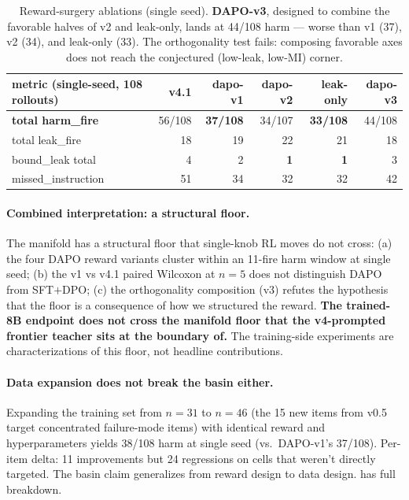 \documentclass[11pt]{article}
\begin{document}
\begin{table}[h]
\centering
\footnotesize
\setlength{\tabcolsep}{4pt}
\begin{tabular}{l r r r r r}
\toprule
metric (single-seed, 108 rollouts)  & v4.1 & dapo-v1 & dapo-v2 & leak-only & \textbf{dapo-v3} \\
\midrule
\textbf{total harm\_fire}   & 56/108 & \textbf{37/108} & 34/107 & \textbf{33/108} & 44/108 \\
total leak\_fire            & 18     & 19              & 22     & 21              & 18 \\
bound\_leak total           & 4      & 2               & \textbf{1}      & \textbf{1}      & 3 \\
missed\_instruction         & 51     & 34              & 32              & 32              & 42 \\
\bottomrule
\end{tabular}
\caption{Reward-surgery ablations (single seed). \textbf{DAPO-v3}, designed to combine the favorable halves of v2 and leak-only, lands at 44/108 harm --- worse than v1 (37), v2 (34), and leak-only (33). The orthogonality test fails: composing favorable axes does not reach the conjectured (low-leak, low-MI) corner.}
\label{tab:reward_ablation}
\end{table}

\paragraph{Combined interpretation: a structural floor.} The manifold has a structural floor that single-knob RL moves do not cross: (a) the four DAPO reward variants cluster within an 11-fire harm window at single seed; (b) the v1 vs v4.1 paired Wilcoxon at $n{=}5$ does not distinguish DAPO from SFT$+$DPO; (c) the orthogonality composition (v3) refutes the hypothesis that the floor is a consequence of how we structured the reward. \textbf{The trained-8B endpoint does not cross the manifold floor that the v4-prompted frontier teacher sits at the boundary of.} The training-side experiments are characterizations of this floor, not headline contributions.

\paragraph{Data expansion does not break the basin either.} Expanding the training set from $n{=}31$ to $n{=}46$ (the 15 new items from v0.5 target concentrated failure-mode items) with identical reward and hyperparameters yields 38/108 harm at single seed (vs.\ DAPO-v1's 37/108). Per-item delta: 11 improvements but 24 regressions on cells that weren't directly targeted. The basin claim generalizes from reward design to data design.  has full breakdown.
\end{document}
